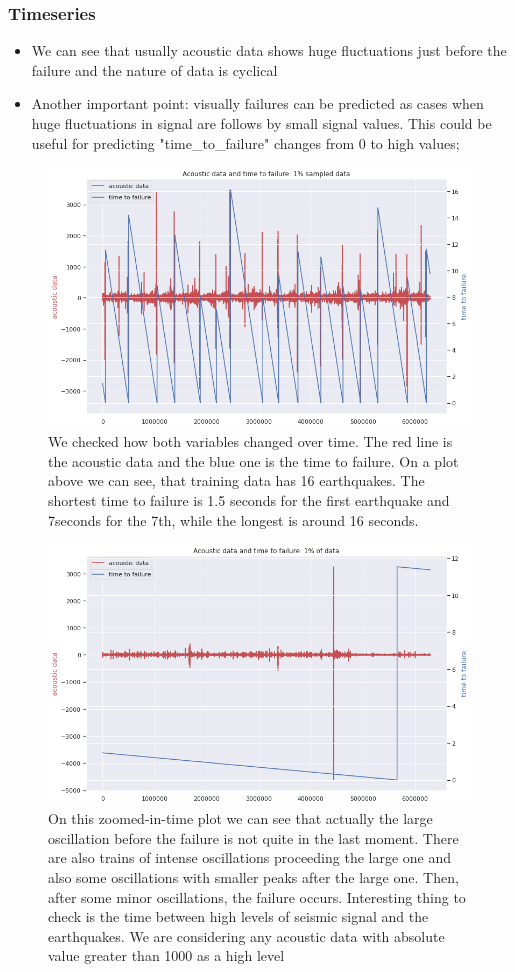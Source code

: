 \documentclass[]{llncs}
\begin{document}
\subsubsection{Timeseries}
\begin{itemize}
	\item We can see that usually acoustic data shows huge fluctuations just before the failure and the nature of data is cyclical
	\item Another important point: visually failures can be predicted as cases when huge fluctuations in signal are follows by small signal values. This could be useful for predicting "time\_to\_failure" changes from 0 to high values;
\end{itemize}
\begin{figure}[h]
	\centering
	\includegraphics[width=0.8\linewidth]{../GPUProject/timeSeries}
	\caption{We checked how both variables changed over time. The red line is the acoustic data and the blue one is the time to failure. On a plot above we can see, that training data has 16 earthquakes. The shortest time to failure is 1.5 seconds for the first earthquake and 7seconds for the 7th, while the longest is around 16 seconds.}
	\label{fig:timeseries}
\end{figure}

\begin{figure}
	\centering
	\includegraphics[width=0.7\linewidth]{../GPUProject/zoomedInTimePlot}
	\caption{On this zoomed-in-time plot we can see that actually the large oscillation before the failure is not quite in the last moment. There are also trains of intense oscillations proceeding the large one and also some oscillations with smaller peaks after the large one. Then, after some minor oscillations, the failure occurs. Interesting thing to check is the time between high levels of seismic signal and the earthquakes. We are considering any acoustic data with absolute value greater than 1000 as a high level}
	\label{fig:zoomedintimeplot}
\end{figure}
\end{document}
